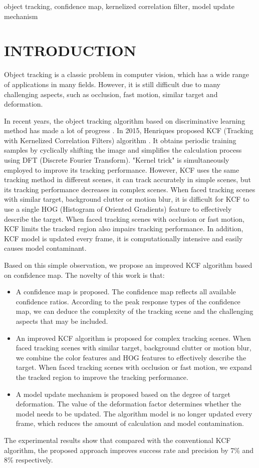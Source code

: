 \documentclass[conference]{IEEEtran}
\begin{document}
\begin{IEEEkeywords}
object tracking, confidence map, kernelized correlation filter, model update mechanism
\end{IEEEkeywords}

\section{INTRODUCTION}
Object tracking is a classic problem in computer vision, which has a wide range of applications in many fields\cite{Survey,Survey2}. 
However, it is still difficult due to many challenging aspects, such as occlusion, fast motion, similar target and deformation.

In recent years, the object tracking algorithm based on discriminative learning method has made a lot of progress \cite{Discriminative}. 
In 2015, Henriques proposed KCF (Tracking with Kernelized Correlation Filters) algorithm \cite{KCF}. 
It obtains periodic training samples by cyclically shifting the image and simplifies the calculation process using DFT (Discrete Fourier Transform). 
"Kernel trick" is simultaneously employed to improve its tracking performance. 
However, KCF uses the same tracking method in different scenes, it can track accurately in simple scenes, but its tracking performance decreases in complex scenes.
When faced tracking scenes with similar target, background clutter or motion blur, it is difficult for KCF to use a single HOG (Histogram of Oriented Gradients) feature to effectively describe the target.
When faced tracking scenes with occlusion or fast motion, KCF limits the tracked region also impairs tracking performance.
In addition, KCF model is updated every frame, it is computationally intensive and easily causes model contaminant.

Based on this simple observation, we propose an improved KCF algorithm based on confidence map.
The novelty of this work is that:
\begin{itemize}
\item A confidence map is proposed. The confidence map reflects all available confidence ratios. According to the peak response types of the confidence map, we can deduce the complexity of the tracking scene and the challenging aspects that may be included.  
\item An improved KCF algorithm is proposed for complex tracking scenes.
When faced tracking scenes with similar target, background clutter or motion blur, we combine the color features and HOG features to effectively describe the target.
When faced tracking scenes with occlusion or fast motion, we expand the tracked region to improve the tracking performance.
\item A model update mechanism is proposed based on the degree of target deformation.
The value of the deformation factor determines whether the model needs to be updated.
The algorithm model is no longer updated every frame, which reduces the amount of calculation and model contamination. 
\end{itemize}
The experimental results show that compared with the conventional KCF algorithm, the proposed approach improves success rate and precision by 7\% and 8\% respectively.
\end{document}
